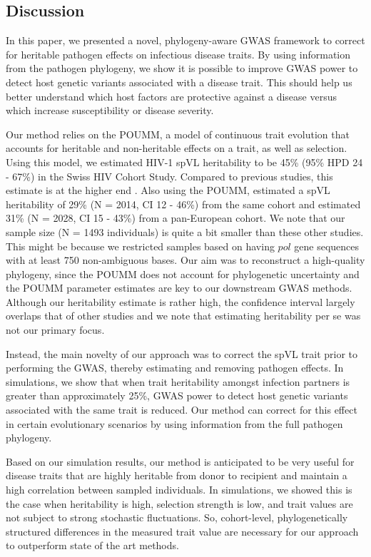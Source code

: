 \documentclass[]{article}
\begin{document}
\begin{doublespace}
\section{Discussion}
In this paper, we presented a novel, phylogeny-aware GWAS framework to correct for heritable pathogen effects on infectious disease traits. By using information from the pathogen phylogeny, we show it is possible to improve GWAS power to detect host genetic variants associated with a disease trait. This should help us better understand which host factors are protective against a disease versus which increase susceptibility or disease severity.

Our method relies on the POUMM, a model of continuous trait evolution that accounts for heritable and non-heritable effects on a trait, as well as selection. Using this model, we estimated HIV-1 spVL heritability to be 45\% (95\% HPD 24 - 67\%) in the Swiss HIV Cohort Study. Compared to previous studies, this estimate is at the higher end \citep{Mitov2018}. Also using the POUMM, \citep{Bertels2018} estimated a spVL heritability of 29\% (N = 2014, CI 12 - 46\%) from the same cohort and \citep{Blanquart2017} estimated 31\% (N = 2028, CI 15 - 43\%) from a pan-European cohort. We note that our sample size (N = 1493 individuals) is quite a bit smaller than these other studies. This might be because we restricted samples based on having $pol$ gene sequences with at least 750 non-ambiguous bases. Our aim was to reconstruct a high-quality phylogeny, since the POUMM does not account for phylogenetic uncertainty and the POUMM parameter estimates are key to our downstream GWAS methods. Although our heritability estimate is rather high, the confidence interval largely overlaps that of other studies and we note that estimating heritability per se was not our primary focus.

Instead, the main novelty of our approach was to correct the spVL trait prior to performing the GWAS, thereby estimating and removing pathogen effects. In simulations, we show that when trait heritability amongst infection partners is greater than approximately 25\%, GWAS power to detect host genetic variants associated with the same trait is reduced. Our method can correct for this effect in certain evolutionary scenarios by using information from the full pathogen phylogeny. 

Based on our simulation results, our method is anticipated to be very useful for disease traits that are highly heritable from donor to recipient and  maintain a high correlation between sampled individuals. In simulations, we showed this is the case when heritability is high, selection strength is low, and trait values are not subject to strong stochastic fluctuations. So, cohort-level, phylogenetically structured differences in the measured trait value are necessary for our approach to outperform state of the art methods. 


\end{doublespace}
\end{document}
